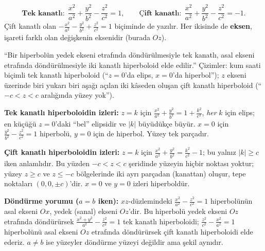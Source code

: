 \begin{tanim}
\[ \textbf{Tek kanatlı:}\ \ \frac{x^2}{a^2}+\frac{y^2}{b^2}-\frac{z^2}{c^2}=1,\qquad
   \textbf{Çift kanatlı:}\ \ \frac{x^2}{a^2}+\frac{y^2}{b^2}-\frac{z^2}{c^2}=-1 . \]
Çift kanatlı olan $-\frac{x^2}{a^2}-\frac{y^2}{b^2}+\frac{z^2}{c^2}=1$ biçiminde de yazılır. Her ikisinde de \textbf{eksen}, işareti farklı olan değişkenin eksenidir (burada $Oz$).
\end{tanim}

\begin{tahta}
``Bir hiperbolün yedek ekseni etrafında döndürülmesiyle tek kanatlı, asal ekseni etrafında döndürülmesiyle iki kanatlı hiperboloid elde edilir.'' Çizimler: kum saati biçimli tek kanatlı hiperboloid (``$z=0$'da elips, $x=0$'da hiperbol''); $z$ ekseni üzerinde biri yukarı biri aşağı açılan iki kâseden oluşan çift kanatlı hiperboloid (``$-c<z<c$ aralığında yüzey yok'').
\end{tahta}

\textbf{Tek kanatlı hiperboloidin izleri:} $z=k$ için $\frac{x^2}{a^2}+\frac{y^2}{b^2}=1+\frac{k^2}{c^2}$, \emph{her} $k$ için elips; en küçüğü $z=0$'daki ``bel'' elipsidir ve $|k|$ büyüdükçe büyür. $x=0$ için $\frac{y^2}{b^2}-\frac{z^2}{c^2}=1$ hiperbolü, $y=0$ için de hiperbol. Yüzey tek parçadır.

\textbf{Çift kanatlı hiperboloidin izleri:} $z=k$ için $\frac{x^2}{a^2}+\frac{y^2}{b^2}=\frac{k^2}{c^2}-1$; bu yalnız $|k|\ge c$ iken anlamlıdır. Bu yüzden $-c<z<c$ şeridinde yüzeyin hiçbir noktası yoktur; yüzey $z\ge c$ ve $z\le-c$ bölgelerinde iki ayrı parçadan (kanattan) oluşur, tepe noktaları $(0,0,\pm c)$'dir. $x=0$ ve $y=0$ izleri hiperboldür.

\textbf{Döndürme yorumu ($a=b$ iken):} $xz$-düzlemindeki $\frac{x^2}{a^2}-\frac{z^2}{c^2}=1$ hiperbolünün asal ekseni $Ox$, yedek (sanal) ekseni $Oz$'dir. Bu hiperbolü yedek ekseni $Oz$ etrafında döndürürsek $\frac{x^2+y^2}{a^2}-\frac{z^2}{c^2}=1$ tek kanatlı hiperboloidi; $\frac{z^2}{c^2}-\frac{x^2}{a^2}=1$ hiperbolünü asal ekseni $Oz$ etrafında döndürürsek çift kanatlı hiperboloidi elde ederiz. $a\neq b$ ise yüzeyler döndürme yüzeyi değildir ama şekil aynıdır.

